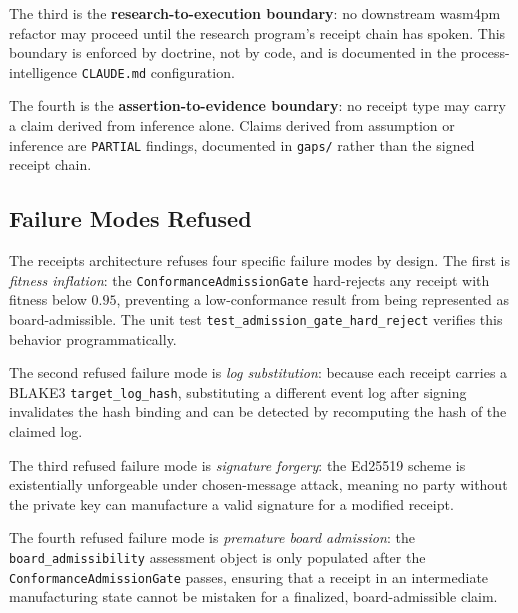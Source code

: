 The third is the \textbf{research-to-execution boundary}: no downstream wasm4pm refactor
may proceed until the research program's receipt chain has spoken. This boundary is
enforced by doctrine, not by code, and is documented in the process-intelligence
\texttt{CLAUDE.md} configuration.

The fourth is the \textbf{assertion-to-evidence boundary}: no receipt type may carry a
claim derived from inference alone. Claims derived from assumption or inference are
\texttt{PARTIAL} findings, documented in \texttt{gaps/} rather than the signed receipt chain.

\subsection{Failure Modes Refused}
\label{sec:receipts-architecture-failures}

The receipts architecture refuses four specific failure modes by design. The first is
\emph{fitness inflation}: the \texttt{ConformanceAdmissionGate} hard-rejects any receipt
with fitness below $0.95$, preventing a low-conformance result from being represented
as board-admissible. The unit test \texttt{test\_admission\_gate\_hard\_reject} verifies
this behavior programmatically.

The second refused failure mode is \emph{log substitution}: because each receipt carries
a BLAKE3 \texttt{target\_log\_hash}, substituting a different event log after signing
invalidates the hash binding and can be detected by recomputing the hash of the claimed
log.

The third refused failure mode is \emph{signature forgery}: the Ed25519 scheme is
existentially unforgeable under chosen-message attack, meaning no party without the
private key can manufacture a valid signature for a modified receipt.

The fourth refused failure mode is \emph{premature board admission}: the
\texttt{board\_admissibility} assessment object is only populated after the
\texttt{ConformanceAdmissionGate} passes, ensuring that a receipt in an intermediate
manufacturing state cannot be mistaken for a finalized, board-admissible claim.
